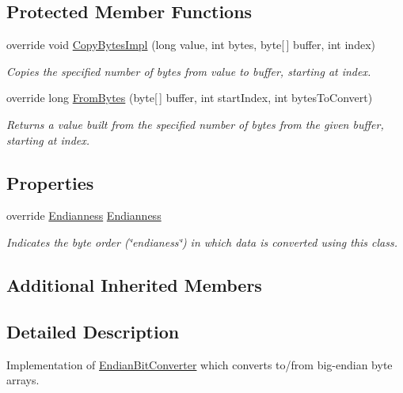 \subsection*{Protected Member Functions}
\begin{DoxyCompactItemize}
\item 
override void \mbox{\hyperlink{class_t_net_1_1_i_o_1_1_big_endian_bit_converter_a3fbb9a8e3f64036d8c8882a857ef4d38}{Copy\+Bytes\+Impl}} (long value, int bytes, byte\mbox{[}$\,$\mbox{]} buffer, int index)
\begin{DoxyCompactList}\small\item\em Copies the specified number of bytes from value to buffer, starting at index. \end{DoxyCompactList}\item 
override long \mbox{\hyperlink{class_t_net_1_1_i_o_1_1_big_endian_bit_converter_a4d62837761d9100fbbc2540c53c15f1f}{From\+Bytes}} (byte\mbox{[}$\,$\mbox{]} buffer, int start\+Index, int bytes\+To\+Convert)
\begin{DoxyCompactList}\small\item\em Returns a value built from the specified number of bytes from the given buffer, starting at index. \end{DoxyCompactList}\end{DoxyCompactItemize}
\subsection*{Properties}
\begin{DoxyCompactItemize}
\item 
override \mbox{\hyperlink{namespace_t_net_1_1_i_o_afd413ccca7a2b11b5a201325685881dc}{Endianness}} \mbox{\hyperlink{class_t_net_1_1_i_o_1_1_big_endian_bit_converter_a2bb1043e1dd56349111dcf2b20169063}{Endianness}}
\begin{DoxyCompactList}\small\item\em Indicates the byte order (\char`\"{}endianess\char`\"{}) in which data is converted using this class. \end{DoxyCompactList}\end{DoxyCompactItemize}
\subsection*{Additional Inherited Members}


\subsection{Detailed Description}
Implementation of \mbox{\hyperlink{class_t_net_1_1_i_o_1_1_endian_bit_converter}{Endian\+Bit\+Converter}} which converts to/from big-\/endian byte arrays. 



